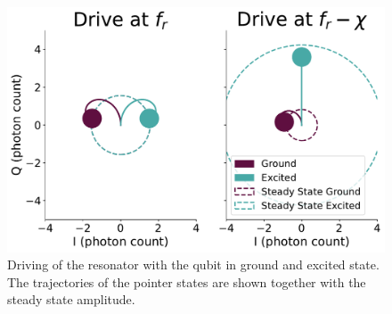 \begin{figure}
    \centering
    \includegraphics{Simulations/readout_simulations/IQ_movement_with_kappa.pdf}
    \caption{Driving of the resonator with the qubit in ground and excited state. The trajectories of the pointer states are shown together with the steady state amplitude.}
    \label{fig:iq_movement_with_kappa}
\end{figure}


